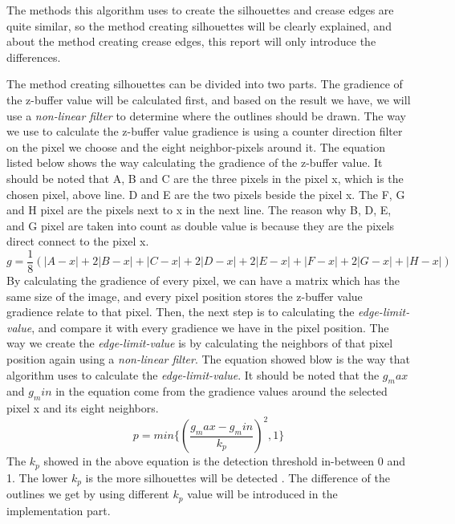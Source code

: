 \documentclass{acmsiggraph}               %
\begin{document}
The methods this algorithm uses to create the silhouettes and crease edges are quite similar, so the method creating silhouettes will be clearly explained, and about the method creating crease edges, this report will only introduce the differences.

The method creating silhouettes can be divided into two parts. The gradience of the z-buffer value will be calculated first, and based on the result we have, we will use a {\em non-linear filter} to determine where the outlines should be drawn. The way we use to calculate the z-buffer value gradience is using a counter direction filter on the pixel we choose and the eight neighbor-pixels around it. The equation listed below shows the way calculating the gradience of the z-buffer value. It should be noted that A, B and C are the three pixels in the pixel x, which is the chosen pixel, above line. D and E are the two pixels beside the pixel x. The F, G and H pixel are the pixels next to x in the next line. The reason why B, D, E, and G pixel are taken into count as double value is because they are the pixels direct connect to the pixel x. 
\begin{equation}
g=\frac{1}{8}(|A-x|+2|B-x|+|C-x|+2|D-x|+2|E-x|+|F-x|+2|G-x|+|H-x|)
\end{equation}
By calculating the gradience of every pixel, we can have a matrix which has the same size of the image, and every pixel position stores the z-buffer value gradience relate to that pixel. Then, the next step is to calculating the {\em edge-limit-value}, and compare it with every gradience we have in the pixel position. The way we create the {\em edge-limit-value} is by calculating the neighbors of that pixel position again using a {\em non-linear filter}. The equation showed blow is the way that algorithm uses to calculate the {\em edge-limit-value}. It should be noted that the $g_max$ and $g_min$ in the equation come from the gradience values around the selected pixel x and its eight neighbors. 
\begin{equation}
p=min\{ (\frac{g_max - g_min}{k_p})^2, 1 \} \label{eq:calq}
\end{equation}
The $k_p$ showed in the above equation is the detection threshold in-between 0 and 1. The lower $k_p$ is the more silhouettes will be detected \cite{Decaudin:1996:CLR}. The difference of the outlines we get by using different $k_p$ value will be introduced in the implementation part.
\end{document}
